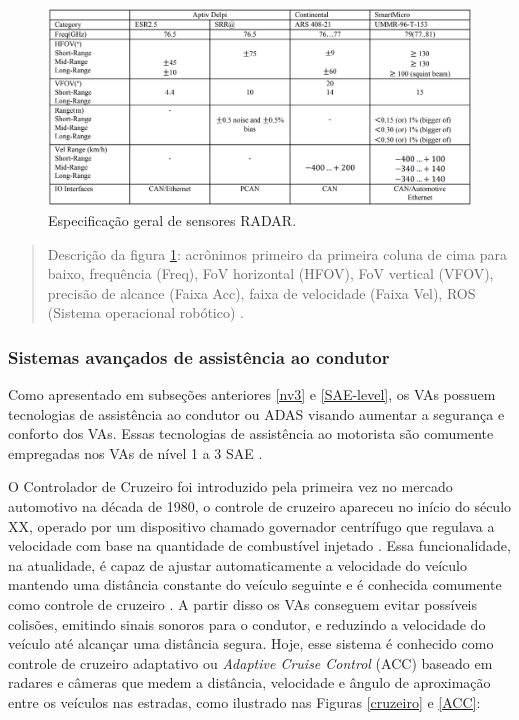 \begin{figure}[H]
\centering
\includegraphics[width=\textwidth]{Figures/radar-table.png}
\caption{Especificação geral de sensores RADAR.}
\label{tabela-radar}
\end{figure}

\begin{quote}
Descrição da figura \ref{tabela-radar}: acrônimos primeiro da primeira coluna de cima para baixo, frequência (Freq), FoV horizontal (HFOV), FoV vertical (VFOV), precisão de alcance (Faixa Acc), faixa de velocidade (Faixa Vel), ROS (Sistema operacional robótico) \cite{sensors}.
\end{quote}


\subsubsection{Sistemas avançados de assistência ao condutor} \label{adas}


Como apresentado em subseções anteriores \ref{nv3} e \ref{SAE-level}, os VAs possuem tecnologias de assistência ao condutor ou ADAS visando aumentar a segurança e conforto dos VAs. Essas tecnologias de assistência ao motorista são comumente empregadas nos VAs de nível 1 a 3 SAE \cite{SAE}.

 \label{cruzeiroo}

O Controlador de Cruzeiro foi introduzido pela primeira vez no mercado automotivo na década de 1980, o controle de cruzeiro apareceu no início do século XX, operado por um dispositivo chamado governador centrífugo que regulava a velocidade com base na quantidade de combustível injetado \cite{caio}. Essa funcionalidade, na atualidade, é capaz de ajustar automaticamente a velocidade do veículo mantendo uma distância constante do veículo seguinte e é conhecida comumente como controle de cruzeiro \cite{sensors-yet}.
A partir disso os VAs conseguem evitar possíveis colisões, emitindo sinais sonoros para o condutor, e reduzindo a velocidade do veículo até alcançar uma distância segura. Hoje, esse sistema é conhecido como controle de cruzeiro adaptativo ou \textit{Adaptive Cruise Control} (ACC) baseado em radares e câmeras que medem a distância, velocidade e ângulo de aproximação entre os veículos nas estradas, como ilustrado nas Figuras \ref{cruzeiro} e \ref{ACC}:

